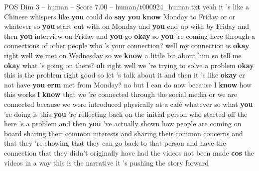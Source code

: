 \begin{textsample}{POS Dim 3 – human – Score 7.00 – human/t000924\_human.txt}  \label{ex:f3_pos_020}
yeah it 's like a Chinese whispers like \textbf{you} could do \textbf{say} \textbf{you} \textbf{know} Monday to Friday or or whatever so \textbf{you} start out with on Monday and \textbf{you} end up with by Friday and then \textbf{you} interview on Friday and \textbf{you} go \textbf{okay} so \textbf{you} 're coming here through a connections of other people who 's your connection? well my connection is \textbf{okay} right well we met on Wednesday so we \textbf{know} a little bit about him so tell me \textbf{okay} what 's going on there? \textbf{oh} right well we 're trying to solve a problem \textbf{okay} this is the problem right good so let 's talk about it and then it 's like \textbf{okay} er not have \textbf{you} \textbf{erm} met from Monday? no but I can do now because I \textbf{know} how this works I \textbf{know} that we 're connected through the social media or we are connected because we were introduced physically at a café whatever so what \textbf{you} 're doing is this \textbf{you} 're reflecting back on the initial person who started off the here 's a problem and then \textbf{you} 've actually shown how people are coming on board sharing their common interests and sharing their common concerns and that they 're showing that they can go back to that person and have the connection that they didn't originally have had the videos not been made \textbf{cos} the videos in a way this is the narrative it 's pushing the story forward

\end{textsample}
